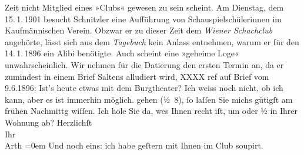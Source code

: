 \begin{ledgroupsized}[t]{13cm}
{{{                     Zeit nicht Mitglied eines »Clubs« gewesen zu sein scheint. Am Dienstag, dem 15. 1. 1901 besucht Schnitzler eine Aufführung von Schauspielschülerinnen im Kaufmännischen Verein.
                     Obzwar er zu dieser Zeit dem \emph{Wiener Schachclub} angehörte, lässt sich aus dem
                     \emph{Tagebuch} kein Anlass entnehmen, warum er für den 14. 1. 1896 ein Alibi benötigte. Auch scheint eine »geheime Loge« unwahrscheinlich. Wir nehmen für die 
                     Datierung den ersten Termin an, da er zumindest in einem Brief Saltens alludiert wird, XXXX ref auf Brief vom 9.6.1896: Ist's heute etwas mit dem Burgtheater? Ich weiss noch nicht, ob ich kann, aber es ist immerhin möglich.}}}\label{K_L03039-111h} gehen
                     \introOben{}(½ 8)\introOben{}, ſo laſſen Sie michs gütigſt am frühen
               Nachmittg wiſſen. Ich hole Sie da{\geminationn}, we{\geminationn}s Ihnen {\pb}recht iſt, um \label{K_L03039-1v}\label{K_L03039-1h} oder ½ in
               Ihrer Wohnung ab? \pend
           \pstart
           Herzlichſt {\\[\baselineskip]}Ihr {\\[\baselineskip]}\spacefill\mbox{Arth}\pend
           \leftskip=0em{}\pstart
           \noindent{}{\pb}Und noch eins: ich habe geſtern mit Ihnen im Club soupirt. \pend
           
         
         \endnumbering{}\end{ledgroupsized}\begin{anhang}\end{anhang}\newcommand{\dateiname}{L03039}\newcommand{\titel}{Arthur Schnitzler an Felix Salten, [9. 6. 1896?]}\newcommand{\editorInnen}{Martin Anton Müller und Laura Untner}
      